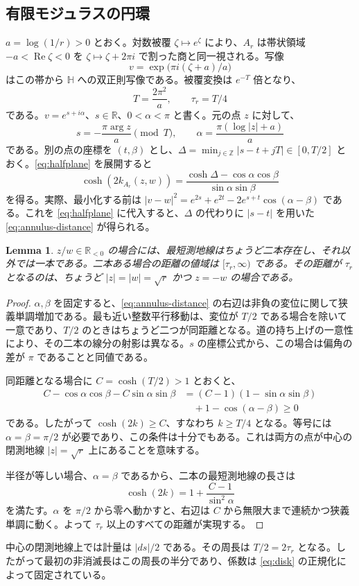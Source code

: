 \documentclass[12pt]{amsart}
\newtheorem{lem}[thm]{Lemma}
\theoremstyle{definition}
\theoremstyle{remark}
\numberwithin{equation}{section}
\newcommand{\R}{\mathbb{R}}
\newcommand{\Z}{\mathbb{Z}}
\begin{document}
\subsection{有限モジュラスの円環}
$a=\log(1/r)>0$ とおく。対数被覆 $\zeta\mapsto e^\zeta$ により、$A_r$ は帯状領域 $-a<\operatorname{Re}\zeta<0$ を $\zeta\mapsto\zeta+2\pi i$ で割った商と同一視される。写像
\[
 v=\exp\bigl(\pi i(\zeta+a)/a\bigr)
\]
はこの帯から $\mathbb H$ への双正則写像である。被覆変換は $e^{-T}$ 倍となり、
\begin{equation}\label{eq:T}
 T=\frac{2\pi^2}{a},\qquad \tau_r=T/4
\end{equation}
である。$v=e^{s+i\alpha}$、$s\in\R$、$0<\alpha<\pi$ と書く。元の点 $z$ に対して、
\[
 s=-\frac{\pi\arg z}{a}\pmod T,\qquad
 \alpha=\frac{\pi(\log|z|+a)}{a}
\]
である。別の点の座標を $(t,\beta)$ とし、$\Delta=\min_{j\in\Z}|s-t+jT|\in[0,T/2]$ とおく。\eqref{eq:halfplane} を展開すると
\begin{equation}\label{eq:annulus-distance}
 \cosh(2k_{A_r}(z,w))=
 \frac{\cosh\Delta-\cos\alpha\cos\beta}{\sin\alpha\sin\beta}
\end{equation}
を得る。実際、最小化する前は $|v-w|^2=e^{2s}+e^{2t}-2e^{s+t}\cos(\alpha-\beta)$ である。これを \eqref{eq:halfplane} に代入すると、$\Delta$ の代わりに $|s-t|$ を用いた \eqref{eq:annulus-distance} が得られる。

\begin{lem}\label{lem:annulus-cuts}
$z/w\in\R_{<0}$ の場合には、最短測地線はちょうど二本存在し、それ以外では一本である。二本ある場合の距離の値域は $[\tau_r,\infty)$ である。その距離が $\tau_r$ となるのは、ちょうど $|z|=|w|=\sqrt r$ かつ $z=-w$ の場合である。
\end{lem}
\begin{proof}
$\alpha,\beta$ を固定すると、\eqref{eq:annulus-distance} の右辺は非負の変位に関して狭義単調増加である。最も近い整数平行移動は、変位が $T/2$ である場合を除いて一意であり、$T/2$ のときはちょうど二つが同距離となる。道の持ち上げの一意性により、その二本の線分の射影は異なる。$s$ の座標公式から、この場合は偏角の差が $\pi$ であることと同値である。

同距離となる場合に $C=\cosh(T/2)>1$ とおくと、
\begin{align*}
 C-\cos\alpha\cos\beta-C\sin\alpha\sin\beta
 &=(C-1)(1-\sin\alpha\sin\beta)\\
 &\quad+1-\cos(\alpha-\beta)\ge0
\end{align*}
である。したがって $\cosh(2k)\ge C$、すなわち $k\ge T/4$ となる。等号には $\alpha=\beta=\pi/2$ が必要であり、この条件は十分でもある。これは両方の点が中心の閉測地線 $|z|=\sqrt r$ 上にあることを意味する。

半径が等しい場合、$\alpha=\beta$ であるから、二本の最短測地線の長さは
\begin{equation}\label{eq:equal-radius}
 \cosh(2k)=1+\frac{C-1}{\sin^2\alpha}
\end{equation}
を満たす。$\alpha$ を $\pi/2$ から零へ動かすと、右辺は $C$ から無限大まで連続かつ狭義単調に動く。よって $\tau_r$ 以上のすべての距離が実現する。
\end{proof}
中心の閉測地線上では計量は $|ds|/2$ である。その周長は $T/2=2\tau_r$ となる。したがって最初の非消滅長はこの周長の半分であり、係数は \eqref{eq:disk} の正規化によって固定されている。
\end{document}
